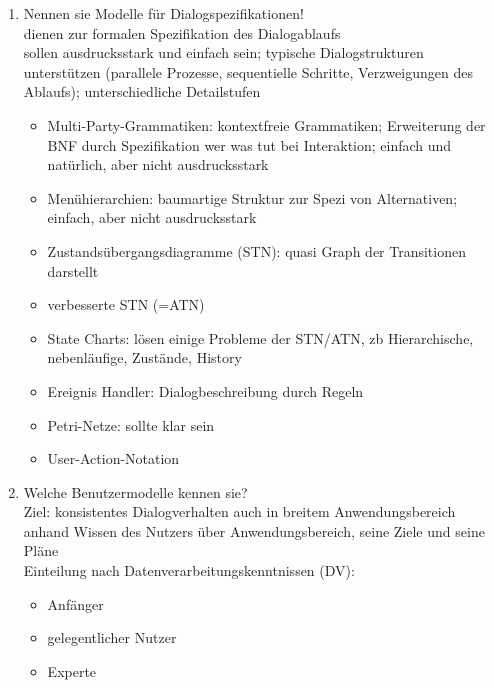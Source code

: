 \begin{enumerate}
	\item Nennen sie Modelle für Dialogspezifikationen!\\
	dienen zur formalen Spezifikation des Dialogablaufs\\
	sollen ausdrucksstark und einfach sein; typische Dialogstrukturen unterstützen (parallele Prozesse, sequentielle Schritte, Verzweigungen des Ablaufs); unterschiedliche Detailstufen
	\begin{itemize}
		\item Multi-Party-Grammatiken: kontextfreie Grammatiken; Erweiterung der BNF durch Spezifikation wer was tut bei Interaktion; einfach und natürlich, aber nicht ausdrucksstark
		\item Menühierarchien: baumartige Struktur zur Spezi von Alternativen; einfach, aber nicht ausdrucksstark
		\item Zustandsübergangsdiagramme (STN): quasi Graph der Transitionen darstellt
		\item verbesserte STN (=ATN)
		\item State Charts: lösen einige Probleme der STN/ATN, zb Hierarchische, nebenläufige, Zustände, History
		\item Ereignis Handler: Dialogbeschreibung durch Regeln
		\item Petri-Netze: sollte klar sein
		\item User-Action-Notation
	\end{itemize}
		
	\item Welche Benutzermodelle kennen sie?\\
	Ziel: konsistentes Dialogverhalten auch in breitem Anwendungsbereich anhand Wissen des Nutzers über Anwendungsbereich, seine Ziele und seine Pläne\\
	Einteilung nach Datenverarbeitungskenntnissen (DV):
	\begin{itemize}
		\item Anfänger
		\item gelegentlicher Nutzer
		\item Experte
	\end{itemize}
		

\end{enumerate}
